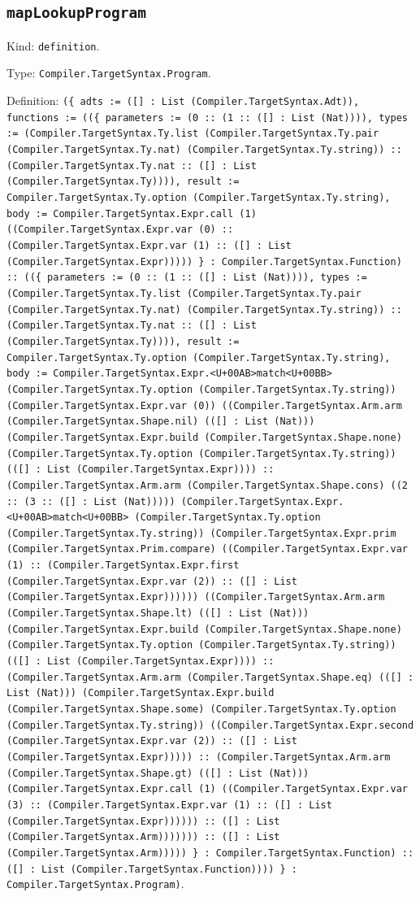 \documentclass[11pt]{article}
\begin{document}
\subsection*{\texttt{mapLookupProgram}}
\noindent Kind: \texttt{definition}.\par
\noindent Type: \texttt{Compiler.TargetSyntax.Program}.\par
\noindent Definition: \texttt{(\{ adts := ([] : List (Compiler.TargetSyntax.Adt)), functions := ((\{ parameters := (0 :: (1 :: ([] : List (Nat)))), types := (Compiler.TargetSyntax.Ty.list (Compiler.TargetSyntax.Ty.pair (Compiler.TargetSyntax.Ty.nat) (Compiler.TargetSyntax.Ty.string)) :: (Compiler.TargetSyntax.Ty.nat :: ([] : List (Compiler.TargetSyntax.Ty)))), result := Compiler.TargetSyntax.Ty.option (Compiler.TargetSyntax.Ty.string), body := Compiler.TargetSyntax.Expr.call (1) ((Compiler.TargetSyntax.Expr.var (0) :: (Compiler.TargetSyntax.Expr.var (1) :: ([] : List (Compiler.TargetSyntax.Expr))))) \} : Compiler.TargetSyntax.Function) :: ((\{ parameters := (0 :: (1 :: ([] : List (Nat)))), types := (Compiler.TargetSyntax.Ty.list (Compiler.TargetSyntax.Ty.pair (Compiler.TargetSyntax.Ty.nat) (Compiler.TargetSyntax.Ty.string)) :: (Compiler.TargetSyntax.Ty.nat :: ([] : List (Compiler.TargetSyntax.Ty)))), result := Compiler.TargetSyntax.Ty.option (Compiler.TargetSyntax.Ty.string), body := Compiler.TargetSyntax.Expr.<U+00AB>match<U+00BB> (Compiler.TargetSyntax.Ty.option (Compiler.TargetSyntax.Ty.string)) (Compiler.TargetSyntax.Expr.var (0)) ((Compiler.TargetSyntax.Arm.arm (Compiler.TargetSyntax.Shape.nil) (([] : List (Nat))) (Compiler.TargetSyntax.Expr.build (Compiler.TargetSyntax.Shape.none) (Compiler.TargetSyntax.Ty.option (Compiler.TargetSyntax.Ty.string)) (([] : List (Compiler.TargetSyntax.Expr)))) :: (Compiler.TargetSyntax.Arm.arm (Compiler.TargetSyntax.Shape.cons) ((2 :: (3 :: ([] : List (Nat))))) (Compiler.TargetSyntax.Expr.<U+00AB>match<U+00BB> (Compiler.TargetSyntax.Ty.option (Compiler.TargetSyntax.Ty.string)) (Compiler.TargetSyntax.Expr.prim (Compiler.TargetSyntax.Prim.compare) ((Compiler.TargetSyntax.Expr.var (1) :: (Compiler.TargetSyntax.Expr.first (Compiler.TargetSyntax.Expr.var (2)) :: ([] : List (Compiler.TargetSyntax.Expr)))))) ((Compiler.TargetSyntax.Arm.arm (Compiler.TargetSyntax.Shape.lt) (([] : List (Nat))) (Compiler.TargetSyntax.Expr.build (Compiler.TargetSyntax.Shape.none) (Compiler.TargetSyntax.Ty.option (Compiler.TargetSyntax.Ty.string)) (([] : List (Compiler.TargetSyntax.Expr)))) :: (Compiler.TargetSyntax.Arm.arm (Compiler.TargetSyntax.Shape.eq) (([] : List (Nat))) (Compiler.TargetSyntax.Expr.build (Compiler.TargetSyntax.Shape.some) (Compiler.TargetSyntax.Ty.option (Compiler.TargetSyntax.Ty.string)) ((Compiler.TargetSyntax.Expr.second (Compiler.TargetSyntax.Expr.var (2)) :: ([] : List (Compiler.TargetSyntax.Expr))))) :: (Compiler.TargetSyntax.Arm.arm (Compiler.TargetSyntax.Shape.gt) (([] : List (Nat))) (Compiler.TargetSyntax.Expr.call (1) ((Compiler.TargetSyntax.Expr.var (3) :: (Compiler.TargetSyntax.Expr.var (1) :: ([] : List (Compiler.TargetSyntax.Expr)))))) :: ([] : List (Compiler.TargetSyntax.Arm))))))) :: ([] : List (Compiler.TargetSyntax.Arm))))) \} : Compiler.TargetSyntax.Function) :: ([] : List (Compiler.TargetSyntax.Function)))) \} : Compiler.TargetSyntax.Program)}.\par
\end{document}
